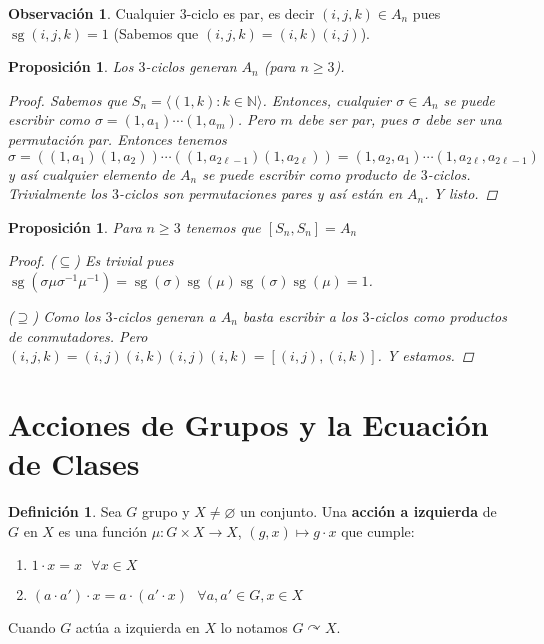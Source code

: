 \documentclass[12pt]{book}
\newtheorem{prop}[teo]{Proposición}
\theoremstyle{definition}
\newtheorem{obs}[teo]{Observación}
\newtheorem{defn}[teo]{Definición}
\newcommand{\NN}{\mathbb{N}}
\let\emptyset\varnothing
\DeclareMathOperator{\sg}{sg}
\def\acts{\curvearrowright}
\begin{document}
\begin{obs}
Cualquier $3$-ciclo es par, es decir $(i,j,k)\in A_n$ pues $\sg(i,j,k)=1$ (Sabemos que $(i,j,k)=(i,k)(i,j)$).
\end{obs}

\begin{prop}
Los $3$-ciclos generan $A_n$ (para $n\geq 3$).
\begin{proof}
Sabemos que $S_n = \langle (1,k) : k\in\NN\rangle$. Entonces, cualquier $\sigma\in A_n$ se puede escribir como $\sigma = (1,a_1)\cdots (1,a_m)$. Pero $m$ debe ser par, pues $\sigma$ debe ser una permutación par. Entonces tenemos $\sigma = ((1,a_1)(1,a_2))\cdots ((1,a_{2\ell-1})(1,a_{2\ell})) = (1,a_2,a_1)\cdots (1,a_{2\ell},a_{2\ell-1})$ y así cualquier elemento de $A_n$ se puede escribir como producto de $3$-ciclos. Trivialmente los $3$-ciclos son permutaciones pares y así están en $A_n$. Y listo.
\end{proof}
\end{prop}

\begin{prop}
Para $n\geq 3$ tenemos que $[S_n,S_n]=A_n$
\begin{proof}
($\subseteq$) Es trivial pues $\sg(\sigma\mu\sigma^{-1}\mu^{-1}) = \sg(\sigma)\sg(\mu)\sg(\sigma)\sg(\mu) = 1$.

($\supseteq$) Como los $3$-ciclos generan a $A_n$ basta escribir a los $3$-ciclos como productos de conmutadores. Pero $(i,j,k) = (i,j)(i,k)(i,j)(i,k) = [(i,j),(i,k)]$. Y estamos.
\end{proof}
\end{prop}

\section{Acciones de Grupos y la Ecuación de Clases}

\begin{defn}
Sea $G$ grupo y $X\neq \emptyset$ un conjunto. Una \textbf{acción a izquierda} de $G$ en $X$ es una función $\mu:G\times X\to X$, $(g,x)\mapsto g\cdot x$ que cumple: \begin{enumerate}\item $1\cdot x = x \text{ }\forall x\in X$ \item $(a\cdot a')\cdot x = a\cdot (a'\cdot x) \text{ } \forall a,a'\in G, x\in X$\end{enumerate}

Cuando $G$ actúa a izquierda en $X$ lo notamos $G\acts X$.
\end{defn}
\end{document}
